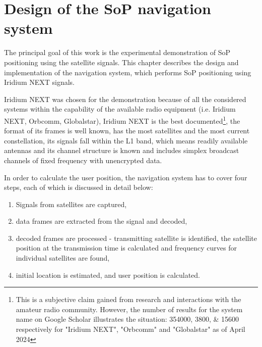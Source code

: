\chapter{Design of the SoP navigation system}
\label{s_des}

The principal goal of this work is the experimental demonstration of SoP positioning using the satellite signals. This chapter describes the design and implementation of the navigation system, which performs SoP positioning using Iridium NEXT signals.

Iridium NEXT was chosen for the demonstration because of all the considered systems within the capability of the available radio equipment (i.e. Iridium NEXT, Orbcomm, Globalstar), Iridium NEXT is the best documented\footnote{This is a subjective claim gained from research and interactions with the amateur radio community. However, the number of results for the system name on Google Scholar illustrates the situation: \numlist{354000; 3800; 15600} respectively for "Iridium NEXT", "Orbcomm" and "Globalstar" as of April 2024}, the format of its frames is well known, has the most satellites and the most current constellation, its signals fall within the L1 band, which means readily available antennas and its channel structure is known and includes simplex broadcast channels of fixed frequency with unencrypted data.

In order to calculate the user position, the navigation system has to cover four steps, each of which is discussed in detail below:
\begin{enumerate}
    \item Signals from satellites are captured,
    \item data frames are extracted from the signal and decoded,
    \item decoded frames are processed - transmitting satellite is identified, the satellite position at the transmission time is calculated and frequency curves for individual satellites are found,
    \item initial location is estimated, and user position is calculated. 
\end{enumerate}

